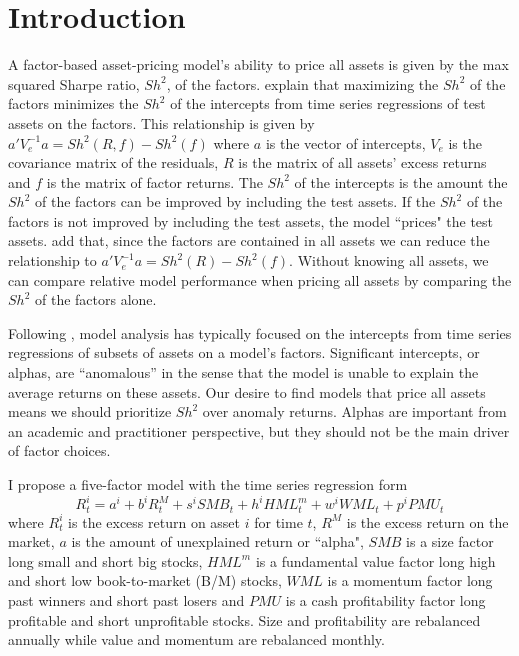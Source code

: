 
\section{Introduction}

A factor-based asset-pricing model’s ability to price all assets is given by the max
squared Sharpe ratio, $Sh^2$, of the factors. \textcite{gibbons1989test} explain that
maximizing the $Sh^2$ of the factors minimizes the $Sh^2$ of the intercepts from time
series regressions of test assets on the factors. This relationship is given by
$a'V_e^{-1}a=Sh^2(R, f) -Sh^2(f)$ where $a$ is the vector of intercepts, $V_e$ is the
covariance matrix of the residuals, $R$ is the matrix of all assets’ excess returns and
$f$ is the matrix of factor returns. The $Sh^2$ of the intercepts is the amount the $Sh^2$
of the factors can be improved by including the test assets. If the $Sh^2$ of the factors
is not improved by including the test assets, the model ``prices" the test assets.
\textcite{barillas2016alpha} add that, since the factors are contained in all assets we
can reduce the relationship to $a'V_e^{-1}a = Sh^2(R)-Sh^2(f)$. Without knowing all
assets, we can compare relative model performance when pricing all assets by comparing the
$Sh^2$ of the factors alone.

Following \textcite{jensen1968performance}, model analysis has typically focused on the
intercepts from time series regressions of subsets of assets on a model’s factors.
Significant intercepts, or alphas, are ``anomalous” in the sense that the model is unable
to explain the average returns on these assets. Our desire to find models that price all
assets means we should prioritize $Sh^2$ over anomaly returns. Alphas are important from
an academic and practitioner perspective, but they should not be the main driver of factor
choices.

I propose a five-factor model with the time series regression form
\begin{equation}
\label{eq:m1}
R_t^i=a^i+b^iR_t^M+s^iSMB_t+h^iHML_t^m+w^iWML_t+p^iPMU_t
\end{equation}
where
$R_t^i$ is the excess return on asset $i$ for time $t$,
$R^M$ is the excess return on the market,
$a$ is the amount of unexplained return or ``alpha",
$SMB$ is a size factor long small and short big stocks,
$HML^m$ is a fundamental value factor long high and short low book-to-market (B/M) stocks,
$WML$ is a momentum factor long past winners and short past losers and
$PMU$ is a cash profitability factor long profitable and short unprofitable stocks.
Size and profitability are rebalanced annually while value and momentum are rebalanced monthly.

